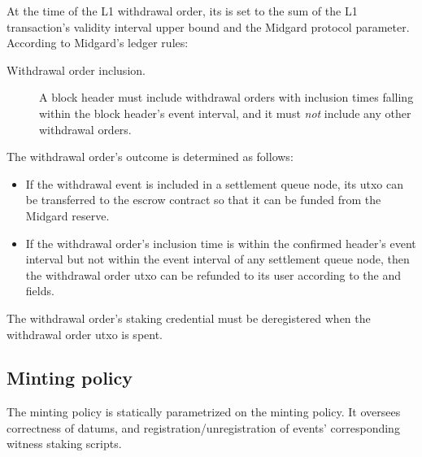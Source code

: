 \documentclass[../midgard.tex]{subfiles}
\begin{document}

At the time of the L1 withdrawal order, its  is set to the sum of the L1 transaction's validity interval upper bound and the  Midgard protocol parameter.
According to Midgard's ledger rules:
\begin{description}
    \item[Withdrawal order inclusion.] A block header must include withdrawal orders with inclusion times falling within the block header's event interval, and it must \emph{not} include any other withdrawal orders.
\end{description}

The withdrawal order's outcome is determined as follows:
\begin{itemize}
    \item If the withdrawal event is included in a settlement queue node, its utxo can be transferred to the escrow contract so that it can be funded from the Midgard reserve.
    \item If the withdrawal order's inclusion time is within the confirmed header's event interval but not within the event interval of any settlement queue node, then the withdrawal order utxo can be refunded to its user according to the  and  fields.
\end{itemize}

The withdrawal order's  staking credential must be deregistered when the withdrawal order utxo is spent.

\subsection{Minting policy}
\label{h:withdrawal-order-minting-policy}

The  minting policy is statically parametrized on the  minting policy.
It oversees correctness of datums, and registration/unregistration of events' corresponding witness staking scripts.
\end{document}
